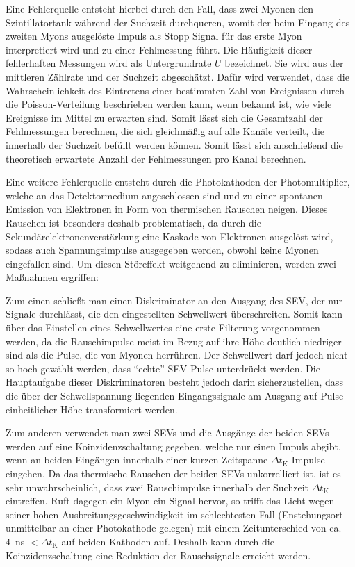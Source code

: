 Eine Fehlerquelle entsteht hierbei durch den Fall, dass zwei Myonen den Szin\-tillator\-tank während der Suchzeit durchqueren, womit der beim Eingang des zweiten Myons ausgelöste Impuls als Stopp Signal für das erste Myon interpretiert wird und zu einer Fehlmessung führt. Die Häufigkeit dieser fehlerhaften Messungen wird als Untergrundrate $U$ bezeichnet. Sie wird aus der mittleren Zählrate und der Suchzeit abgeschätzt. Dafür wird verwendet, dass die Wahrscheinlichkeit des Eintretens einer bestimmten Zahl von Ereignissen durch die Poisson-Verteilung beschrieben werden kann, wenn bekannt ist, wie viele Ereignisse im Mittel zu erwarten sind. Somit lässt sich die Gesamtzahl der Fehlmessungen berechnen, die sich gleichmäßig auf alle Kanäle verteilt, die innerhalb der Suchzeit befüllt werden können. Somit lässt sich anschließend die theoretisch erwartete Anzahl der Fehlmessungen pro Kanal berechnen.

Eine weitere Fehlerquelle entsteht durch die Photokathoden der Photomultiplier, welche an das Detektormedium angeschlossen sind und zu einer spontanen Emission von Elektronen in Form von thermischen Rauschen neigen. Dieses Rauschen ist besonders deshalb problematisch, da durch die Sekundärelektronenverstärkung eine Kaskade von Elektronen ausgelöst wird, sodass auch Spannungsimpulse ausgegeben werden, obwohl keine Myonen eingefallen sind. Um diesen Störeffekt weitgehend zu eliminieren, werden zwei Maßnahmen ergriffen:

Zum einen schließt man einen Diskriminator an den Ausgang des SEV, der nur Signale durchlässt, die den eingestellten Schwellwert überschreiten. Somit kann über das Einstellen eines Schwellwertes eine erste Filterung vorgenommen werden, da die Rauschimpulse meist im Bezug auf ihre Höhe deutlich niedriger sind als die Pulse, die von Myonen  herrühren. Der Schwellwert darf jedoch nicht so hoch gewählt werden, dass "`echte"' SEV-Pulse unterdrückt werden. Die Hauptaufgabe dieser Diskriminatoren besteht jedoch darin sicherzustellen, dass die über der Schwellspannung liegenden Eingangssignale am Ausgang auf Pulse einheitlicher Höhe transformiert werden.

Zum anderen verwendet man zwei SEVs und die Ausgänge der beiden SEVs werden auf eine Koinzidenzschaltung gegeben, welche nur einen Impuls abgibt, wenn an beiden Eingängen innerhalb einer kurzen Zeitspanne $\Delta t_{\textrm{K}}$ Impulse eingehen. Da das thermische Rauschen der beiden SEVs unkorrelliert ist, ist es sehr unwahrscheinlich, dass zwei Rauschimpulse innerhalb der Suchzeit $\Delta t_{\textrm{K}}$ eintreffen. 
Ruft dagegen ein Myon ein Signal hervor, so trifft das Licht wegen seiner hohen Ausbreitungsgeschwindigkeit im schlechtesten Fall (Enstehungsort unmittelbar an einer Photokathode gelegen) mit einem Zeitunterschied von ca. \SI{4}{ns} $ < \Delta t_{\textrm{K}}$ auf beiden Kathoden auf.
Deshalb kann durch die Koinzidenzschaltung eine Reduktion der Rauschsignale erreicht werden.

